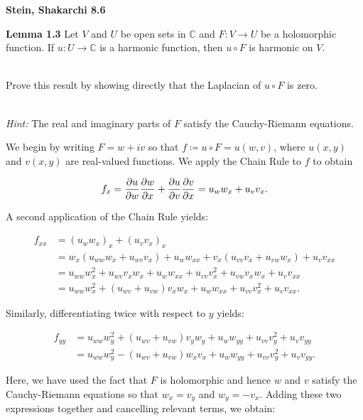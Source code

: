 \textbf{Stein, Shakarchi 8.6}

\textbf{Lemma 1.3} Let $V$ and $U$ be open sets in $\mathbb{C}$ and $F: V \to U$ be a holomorphic function. If 
$u: U \to \mathbb{C}$ is a harmonic function, then $u \circ F$ is harmonic on $V$.

\ \\
Prove this result by showing directly that the Laplacian of $u \circ F$ is zero.

\ \\
\textit{Hint:} The real and imaginary parts of $F$ satisfy the Cauchy-Riemann equations.

\begin{solution}
  We begin by writing $F = w + iv$ so that $f \coloneqq u \circ F = u(w, v)$, where $u(x, y)$ and $v(x, y)$ are 
  real-valued functions. We apply the Chain Rule to $f$ to obtain 

  $$
    f_x = \frac{\partial u}{\partial w} \frac{\partial w}{\partial x} + \frac{\partial u}{\partial v} \frac{\partial v}{\partial x} = u_w w_x + u_v v_x.
  $$

  A second application of the Chain Rule yields:

  \begin{align*}
   f_{xx} &= (u_w w_x)_x + (u_v v_x)_x \\
          &= w_x \left(u_{ww} w_x + u_{wv} v_x\right) + u_w w_{xx} + v_x \left(u_{vv} v_x + u_{vw} w_x\right) + u_v v_{xx} \\
          &= u_{ww} w_x^2 + u_{wv} v_x w_x + u_w w_{xx} + u_{vv} v_x^2 + u_{vw} v_x w_x + u_v v_{xx} \\
          &= u_{ww} w_x^2 + \left(u_{wv} + u_{vw}\right) v_x w_x + u_w w_{xx} + u_{vv} v_x^2 + u_v v_{xx}.
  \end{align*}

  Similarly, differentiating twice with respect to $y$ yields:

  \begin{align*}
   f_{yy} &= u_{ww} w_y^2 + \left(u_{wv} + u_{vw}\right) v_y w_y + u_w w_{yy} + u_{vv} v_y^2 + u_v v_{yy} \\
          &= u_{ww} w_y^2 - \left(u_{wv} + u_{vw}\right) w_x v_x + u_w w_{yy} + u_{vv} v_y^2 + u_v v_{yy}.
  \end{align*}

  Here, we have used the fact that $F$ is holomorphic and hence $w$ and $v$ satisfy the Cauchy-Riemann equations so 
  that $w_x = v_y$ and $w_y = -v_x$. Adding these two expressions together and cancelling relevant terms, we obtain:


\end{solution}
